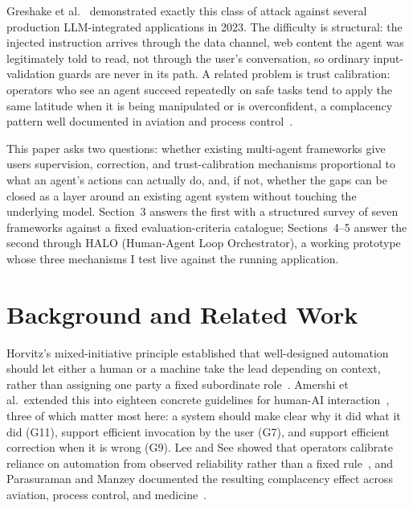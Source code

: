 \documentclass[a4paper, 11pt]{article}
\begin{document}
Greshake et al.~\cite{greshake2023indirect} demonstrated exactly this class of
attack against several production LLM-integrated applications in 2023. The
difficulty is structural: the injected instruction arrives through the data
channel, web content the agent was legitimately told to read, not through the
user's conversation, so ordinary input-validation guards are never in its path.
A related problem is trust calibration: operators who see an agent succeed
repeatedly on safe tasks tend to apply the same latitude when it is being
manipulated or is overconfident, a complacency pattern well documented in
aviation and process control~\cite{parasuraman2010complacency, lee2004trust}.

This paper asks two questions: whether existing multi-agent frameworks give
users supervision, correction, and trust-calibration mechanisms proportional to
what an agent's actions can actually do, and, if not, whether the gaps can be
closed as a layer around an existing agent system without touching the
underlying model. Section~3 answers the first with a structured survey of seven
frameworks against a fixed evaluation-criteria catalogue; Sections~4--5 answer
the second through HALO (Human-Agent Loop Orchestrator), a working prototype
whose three mechanisms I test live against the running application.

\section{Background and Related Work}

Horvitz's mixed-initiative principle established that well-designed automation
should let either a human or a machine take the lead depending on context, rather
than assigning one party a fixed subordinate role~\cite{horvitz1999principles}.
Amershi et al.\ extended this into eighteen concrete guidelines for human-AI
interaction~\cite{amershi2019guidelines}, three of which matter most here: a
system should make clear why it did what it did (G11), support efficient
invocation by the user (G7), and support efficient correction when it is wrong
(G9). Lee and See showed that operators calibrate reliance on automation from
observed reliability rather than a fixed rule~\cite{lee2004trust}, and Parasuraman
and Manzey documented the resulting complacency effect across aviation, process
control, and medicine~\cite{parasuraman2010complacency}.
\end{document}
